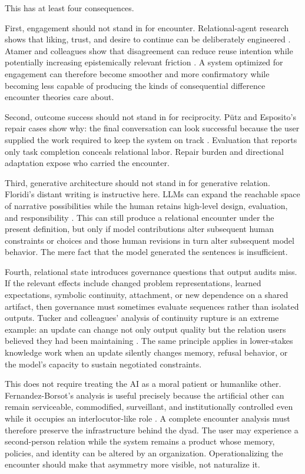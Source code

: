 \documentclass[11pt]{article}
\begin{document}
This has at least four consequences.

First, engagement should not stand in for encounter. Relational-agent research shows that liking, trust, and desire to continue can be deliberately engineered \citep{BickmorePicard2005Relationships}. Atamer and colleagues show that disagreement can reduce reuse intention while potentially increasing epistemically relevant friction \citep{AtamerPintoShah2026Disagreement}. A system optimized for engagement can therefore become smoother and more confirmatory while becoming less capable of producing the kinds of consequential difference encounter theories care about.

Second, outcome success should not stand in for reciprocity. P\"utz and Esposito's repair cases show why: the final conversation can look successful because the user supplied the work required to keep the system on track \citep{PutzEsposito2024Repair}. Evaluation that reports only task completion conceals relational labor. Repair burden and directional adaptation expose who carried the encounter.

Third, generative architecture should not stand in for generative relation. Floridi's distant writing is instructive here. LLMs can expand the reachable space of narrative possibilities while the human retains high-level design, evaluation, and responsibility \citep{Floridi2025DistantWriting}. This can still produce a relational encounter under the present definition, but only if model contributions alter subsequent human constraints or choices and those human revisions in turn alter subsequent model behavior. The mere fact that the model generated the sentences is insufficient.

Fourth, relational state introduces governance questions that output audits miss. If the relevant effects include changed problem representations, learned expectations, symbolic continuity, attachment, or new dependence on a shared artifact, then governance must sometimes evaluate sequences rather than isolated outputs. Tucker and colleagues' analysis of continuity rupture is an extreme example: an update can change not only output quality but the relation users believed they had been maintaining \citep{TuckerGoodingsEllis2026Continuity}. The same principle applies in lower-stakes knowledge work when an update silently changes memory, refusal behavior, or the model's capacity to sustain negotiated constraints.

This does not require treating the AI as a moral patient or humanlike other. Fernandez-Borsot's analysis is useful precisely because the artificial other can remain serviceable, commodified, surveillant, and institutionally controlled even while it occupies an interlocutor-like role \citep{FernandezBorsot2025Otherness}. A complete encounter analysis must therefore preserve the infrastructure behind the dyad. The user may experience a second-person relation while the system remains a product whose memory, policies, and identity can be altered by an organization. Operationalizing the encounter should make that asymmetry more visible, not naturalize it.
\end{document}

